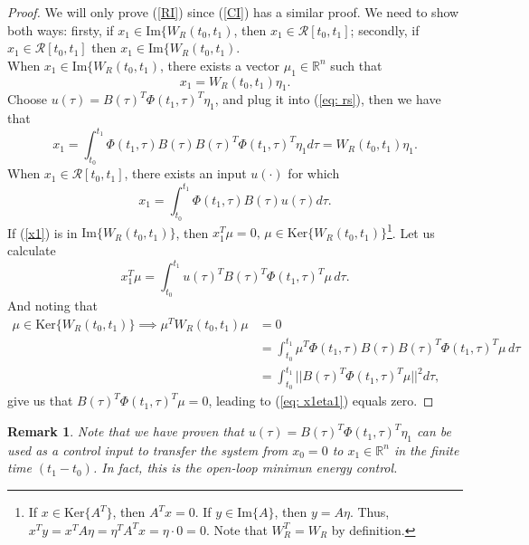 \documentclass[11pt,a4paper,titlepage]{article}
\newtheorem{remark}{Remark}
\begin{document}
\begin{proof}
	We will only prove (\ref{RI}) since (\ref{CI}) has a similar proof.
	We need to show both ways: firsty, if $x_1 \in \text{Im}\{W_R(t_0,t_1)$, then $x_1 \in \mathcal{R}[t_0,t_1]$; secondly, if $x_1 \in \mathcal{R}[t_0,t_1]$ then $x_1 \in \text{Im}\{W_R(t_0,t_1)$.\\
	When $x_1 \in \text{Im}\{W_R(t_0,t_1)$, there exists a vector $\mu_1\in\mathbb{R}^n$ such that
	\begin{equation}
	x_1 = W_R(t_0,t_1)\eta_1.
	\end{equation}
	Choose $u(\tau) = B(\tau)^T\Phi(t_1, \tau)^T\eta_1$, and plug it into (\ref{eq: rs}), then we have that
	\begin{equation}
	x_1 = \int_{t_0}^{t_1} \Phi(t_1,\tau)B(\tau) B(\tau)^T\Phi(t_1, \tau)^T \eta_1d\tau = W_R(t_0,t_1)\eta_1.
	\end{equation}
	When $x_1 \in \mathcal{R}[t_0,t_1]$, there exists an input $u(\cdot)$ for which
	\begin{equation}
		x_1 = \int_{t_0}^{t_1} \Phi(t_1,\tau)B(\tau)u(\tau)d\tau.
		\label{x1}
	\end{equation}
	If (\ref{x1}) is in $\text{Im}\{W_R(t_0,t_1)\}$, then $x_1^T\mu = 0, \, \mu \in \text{Ker}\{W_R(t_0,t_1)\}$\footnote{If $x\in\text{Ker}\{A^T\}$, then $A^Tx = 0$. If $y\in\text{Im}\{A\}$, then $y = A\eta$. Thus, $x^Ty = x^TA\eta = \eta^TA^Tx = \eta \cdot 0 = 0$. Note that $W_R^T = W_R$ by definition.}. Let us calculate
	\begin{equation}
		x_1^T\mu = \int_{t_0}^{t_1}u(\tau)^TB(\tau)^T\Phi(t_1,\tau)^T\mu \, d\tau. \label{eq: x1eta1}
	\end{equation}
	And noting that
	\begin{align}
	\mu \in \text{Ker}\{W_R(t_0,t_1)\} \implies \mu^TW_R(t_0,t_1)\mu &= 0 \nonumber \\ &= \int_{t_0}^{t_1}\mu^T \Phi(t_1,\tau)B(\tau)B(\tau)^T\Phi(t_1,\tau)^T \mu \, d\tau \nonumber \\ &= \int_{t_0}^{t_1} ||B(\tau)^T\Phi(t_1,\tau)^T \mu||^2 d \tau,
	\end{align}
	give us that $B(\tau)^T\Phi(t_1,\tau)^T \mu  = 0$, leading to (\ref{eq: x1eta1}) equals zero.
\end{proof}
\begin{remark}
Note that we have proven that $u(\tau) = B(\tau)^T\Phi(t_1,\tau)^T \eta_1$ can be used as a control input to transfer the system from $x_0 = 0$ to $x_1\in\mathbb{R}^n$ in the finite time $(t_1 - t_0)$. In fact, this is the \emph{open-loop minimun energy control}.
\end{remark}
\end{document}
